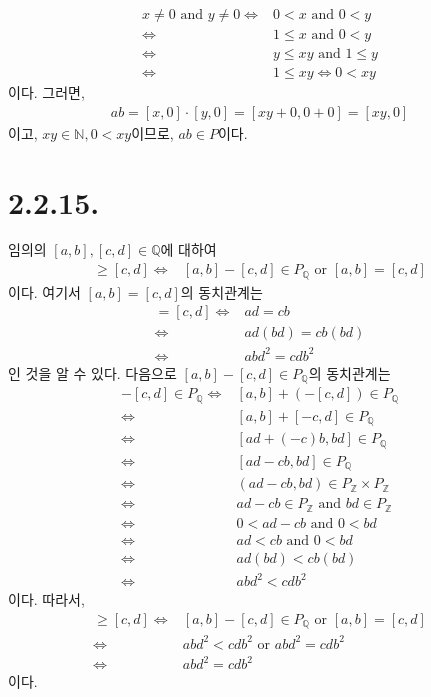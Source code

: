 \documentclass{article}
\begin{document}
\begin{align*}
x \neq 0 \text{ and } y \neq 0 \iff& 0 < x \text{ and } 0 < y
\\ \iff& 1 \le x \text{ and } 0 < y
\\ \iff& y \le xy \text{ and } 1 \le y
\\ \iff& 1 \le xy \iff 0 < xy
\end{align*}이다. 그러면,
\begin{align*}
ab = [x, 0] \cdot [y, 0] = [xy+0, 0+0] = [xy, 0]
\end{align*}이고, $xy \in \mathbb{N}, 0 < xy$이므로, $ab \in P$이다.


\section{2.2.15.}
임의의 $[a, b], [c, d] \in \mathbb{Q}$에 대하여
\begin{align*}
[a, b] \ge [c, d] \iff& [a, b] - [c, d] \in P_{\mathbb{Q}} \text{ or } [a, b] = [c, d]
\end{align*}이다. 여기서 $[a, b] = [c, d]$의 동치관계는
\begin{align*}
[a, b] = [c, d] \iff& ad = cb
\\ \iff& ad(bd) = cb(bd) \tag{$\because bd \neq 0$}
\\ \iff& abd^2 = cdb^2
\end{align*}인 것을 알 수 있다. 다음으로 $[a, b] - [c, d] \in P_{\mathbb{Q}}$의 동치관계는
\begin{align*}
[a, b] - [c, d] \in P_{\mathbb{Q}} \iff& [a, b] + (-[c, d]) \in P_{\mathbb{Q}}
\\ \iff& [a, b] + [-c, d] \in P_{\mathbb{Q}}
\\ \iff& [ad+(-c)b, bd] \in P_{\mathbb{Q}}
\\ \iff& [ad-cb, bd] \in P_{\mathbb{Q}}
\\ \iff& (ad-cb, bd) \in P_{\mathbb{Z}} \times P_{\mathbb{Z}}
\\ \iff& ad-cb \in P_{\mathbb{Z}} \text{ and } bd \in P_{\mathbb{Z}}
\\ \iff& 0 < ad-cb \text{ and } 0 < bd
\\ \iff& ad < cb \text{ and } 0 < bd
\\ \iff& ad(bd) < cb(bd)
\\ \iff& abd^2 < cdb^2
\end{align*}이다. 따라서, 
\begin{align*}
[a, b] \ge [c, d] \iff& [a, b] - [c, d] \in P_{\mathbb{Q}} \text{ or } [a, b] = [c, d]
\\ \iff& abd^2 < cdb^2 \text{ or } abd^2 = cdb^2
\\ \iff& abd^2 = cdb^2
\end{align*}이다. 
\end{document}
